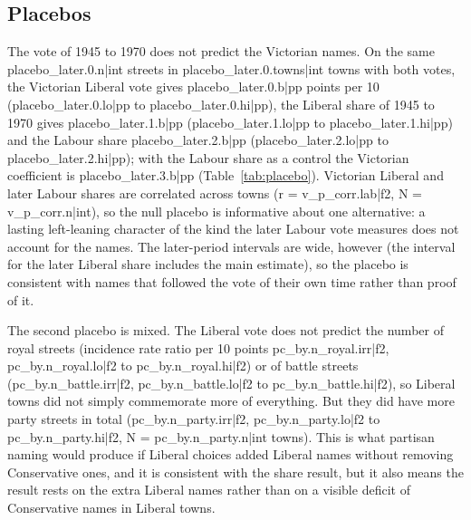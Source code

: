 \documentclass[11pt,a4paper]{article}
\begin{document}
\subsection{Placebos}
The vote of 1945 to 1970 does not predict the Victorian names. On the same {{placebo_later.0.n|int}} streets in {{placebo_later.0.towns|int}} towns with both votes, the Victorian Liberal vote gives {{placebo_later.0.b|pp}} points per 10 ({{placebo_later.0.lo|pp}} to {{placebo_later.0.hi|pp}}), the Liberal share of 1945 to 1970 gives {{placebo_later.1.b|pp}} ({{placebo_later.1.lo|pp}} to {{placebo_later.1.hi|pp}}) and the Labour share {{placebo_later.2.b|pp}} ({{placebo_later.2.lo|pp}} to {{placebo_later.2.hi|pp}}); with the Labour share as a control the Victorian coefficient is {{placebo_later.3.b|pp}} (Table~\ref{tab:placebo}). Victorian Liberal and later Labour shares are correlated across towns (r = {{v_p_corr.lab|f2}}, N = {{v_p_corr.n|int}}), so the null placebo is informative about one alternative: a lasting left-leaning character of the kind the later Labour vote measures does not account for the names. The later-period intervals are wide, however (the interval for the later Liberal share includes the main estimate), so the placebo is consistent with names that followed the vote of their own time rather than proof of it.

The second placebo is mixed. The Liberal vote does not predict the number of royal streets (incidence rate ratio per 10 points {{pc_by.n_royal.irr|f2}}, {{pc_by.n_royal.lo|f2}} to {{pc_by.n_royal.hi|f2}}) or of battle streets ({{pc_by.n_battle.irr|f2}}, {{pc_by.n_battle.lo|f2}} to {{pc_by.n_battle.hi|f2}}), so Liberal towns did not simply commemorate more of everything. But they did have more party streets in total ({{pc_by.n_party.irr|f2}}, {{pc_by.n_party.lo|f2}} to {{pc_by.n_party.hi|f2}}, N = {{pc_by.n_party.n|int}} towns). This is what partisan naming would produce if Liberal choices added Liberal names without removing Conservative ones, and it is consistent with the share result, but it also means the result rests on the extra Liberal names rather than on a visible deficit of Conservative names in Liberal towns.
\end{document}
